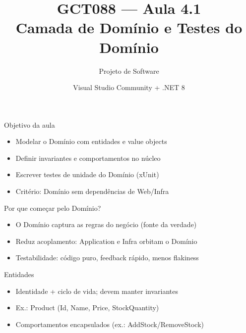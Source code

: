 \documentclass{beamer}
\title{GCT088 — Aula 4.1\\Camada de Domínio e Testes do Domínio}
\author{Projeto de Software}
\institute{UFLA}
\date{Visual Studio Community + .NET 8}
\begin{document}
\begin{frame}
  \titlepage
\end{frame}

\begin{frame}{Objetivo da aula}
\begin{itemize}
  \item Modelar o Domínio com entidades e value objects
  \item Definir invariantes e comportamentos no núcleo
  \item Escrever testes de unidade do Domínio (xUnit)
  \item Critério: Domínio sem dependências de Web/Infra
\end{itemize}
\end{frame}

\begin{frame}{Por que começar pelo Domínio?}
\begin{itemize}
  \item O Domínio captura as regras do negócio (fonte da verdade)
  \item Reduz acoplamento: Application e Infra orbitam o Domínio
  \item Testabilidade: código puro, feedback rápido, menos flakiness
\end{itemize}
\end{frame}

\begin{frame}{Entidades}
\begin{itemize}
  \item Identidade + ciclo de vida; devem manter invariantes
  \item Ex.: Product (Id, Name, Price, StockQuantity)
  \item Comportamentos encapsulados (ex.: AddStock/RemoveStock)
\end{itemize}
\end{frame}
\end{document}
